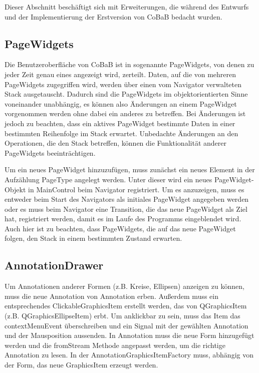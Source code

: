 Dieser Abschnitt beschäftigt sich mit Erweiterungen, die während des Entwurfs und der Implementierung der Erstversion von CoBaB bedacht wurden.

\subsection{PageWidgets}
Die Benutzeroberfläche von CoBaB ist in sogenannte PageWidgets, von denen zu jeder Zeit genau eines angezeigt wird, zerteilt.
Daten, auf die von mehreren PageWidgets zugegriffen wird, werden über einen vom Navigator verwalteten Stack ausgetauscht.
Dadurch sind die PageWidgets im objektorientierten Sinne voneinander unabhängig, es können also Änderungen an einem PageWidget vorgenommen werden ohne dabei ein anderes zu betreffen.
Bei Änderungen ist jedoch zu beachten, dass ein aktives PageWidget bestimmte Daten in einer bestimmten Reihenfolge im Stack erwartet.
Unbedachte Änderungen an den Operationen, die den Stack betreffen, können die Funktionalität anderer PageWidgets beeinträchtigen.

Um ein neues PageWidget hinzuzufügen, muss zunächst ein neues Element in der Aufzählung PageType angelegt werden. Unter dieser wird ein neues PageWidget-Objekt in MainControl beim Navigator registriert. Um es anzuzeigen, muss es entweder beim Start des Navigators als initiales PageWidget angegeben werden oder es muss beim Navigator eine Transition, die das neue PageWidget als Ziel hat, registriert werden, damit es im Laufe des Programms eingeblendet wird. Auch hier ist zu beachten, dass PageWidgets, die auf das neue PageWidget folgen, den Stack in einem bestimmten Zustand erwarten.

\subsection{AnnotationDrawer}
Um Annotationen anderer Formen (z.B. Kreise, Ellipsen) anzeigen zu können, muss die neue Annotation von Annotation erben. Außerdem muss ein entsprechendes ClickableGraphicsItem erstellt werden, das von QGraphicsItem (z.B. QGraphicsEllipseItem) erbt. Um anklickbar zu sein, muss das Item das contextMenuEvent überschreiben und ein Signal mit der gewählten Annotation und der Mausposition aussenden. In Annotation muss die neue Form hinzugefügt werden und die fromStream Methode angepasst werden, um die richtige Annotation zu lesen. In der AnnotationGraphicsItemFactory muss, abhängig von der Form, das neue GraphicsItem erzeugt werden.

